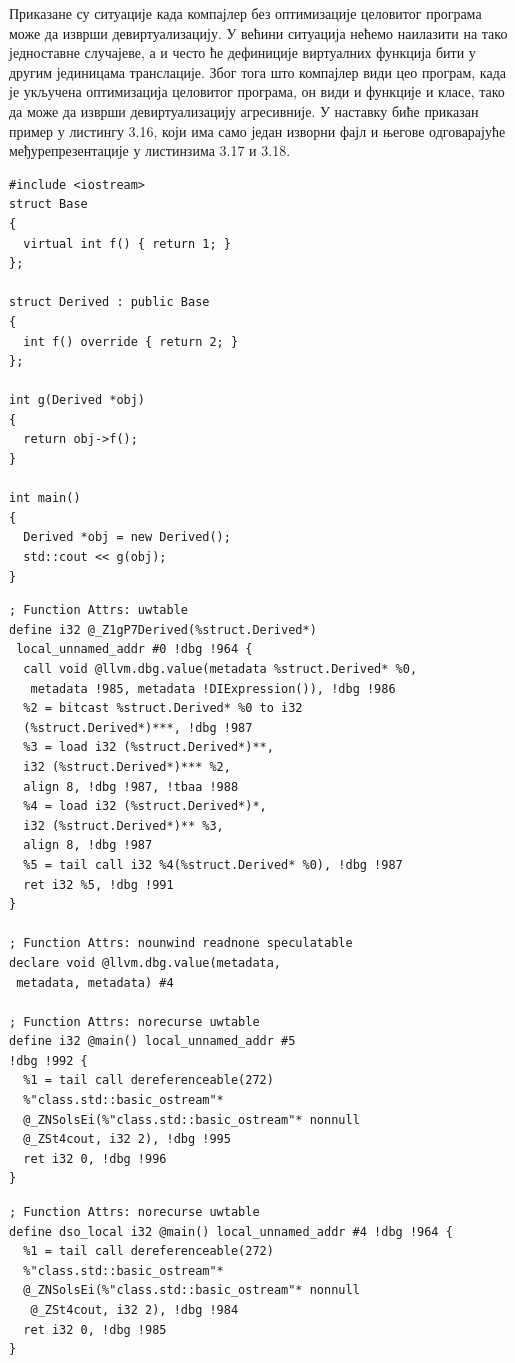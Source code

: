 \documentclass[12pt,oneside]{memoir}
\begin{document}
 Приказане су ситуације када компајлер без оптимизације целовитог програма може да
 изврши девиртуализацију.
 У већини ситуација нећемо наилазити на тако једноставне случајеве, а и често ће
 дефиниције виртуалних функција бити у другим јединицама транслације.
 Због тога што компајлер види цео програм, када је укључена оптимизација
 целовитог програма, он види и функције и класе, тако да може да изврши
 девиртуализацију агресивније.
 У наставку биће приказан  пример у листингу 3.16, који има само један изворни фајл и 
 његове одговарајуће међурепрезентације у листинзима 3.17 и 3.18.
 \begin{lstlisting}[frame=single,caption={Devirtualizacija primer}, captionpos=b]
#include <iostream>
struct Base
{
  virtual int f() { return 1; }
};

struct Derived : public Base
{
  int f() override { return 2; }
};

int g(Derived *obj)
{
  return obj->f();
}

int main()
{
  Derived *obj = new Derived();
  std::cout << g(obj);
}
\end{lstlisting}
	
\begin{lstlisting}[frame=single,caption={Međureprezentacija bez optimizacije celovitog programa }, captionpos=b]
; Function Attrs: uwtable
define i32 @_Z1gP7Derived(%struct.Derived*)
 local_unnamed_addr #0 !dbg !964 {
  call void @llvm.dbg.value(metadata %struct.Derived* %0,
   metadata !985, metadata !DIExpression()), !dbg !986
  %2 = bitcast %struct.Derived* %0 to i32 
  (%struct.Derived*)***, !dbg !987
  %3 = load i32 (%struct.Derived*)**, 
  i32 (%struct.Derived*)*** %2, 
  align 8, !dbg !987, !tbaa !988
  %4 = load i32 (%struct.Derived*)*, 
  i32 (%struct.Derived*)** %3, 
  align 8, !dbg !987
  %5 = tail call i32 %4(%struct.Derived* %0), !dbg !987
  ret i32 %5, !dbg !991
}

; Function Attrs: nounwind readnone speculatable
declare void @llvm.dbg.value(metadata,
 metadata, metadata) #4

; Function Attrs: norecurse uwtable
define i32 @main() local_unnamed_addr #5 
!dbg !992 {
  %1 = tail call dereferenceable(272) 
  %"class.std::basic_ostream"* 
  @_ZNSolsEi(%"class.std::basic_ostream"* nonnull 
  @_ZSt4cout, i32 2), !dbg !995
  ret i32 0, !dbg !996
}
\end{lstlisting}

\begin{lstlisting}[frame=single,caption={Međureprezentacija sa optimizacijom celovitog programa }, captionpos=b]
; Function Attrs: norecurse uwtable
define dso_local i32 @main() local_unnamed_addr #4 !dbg !964 {
  %1 = tail call dereferenceable(272) 
  %"class.std::basic_ostream"* 
  @_ZNSolsEi(%"class.std::basic_ostream"* nonnull
   @_ZSt4cout, i32 2), !dbg !984
  ret i32 0, !dbg !985
}
\end{lstlisting}
\end{document}
